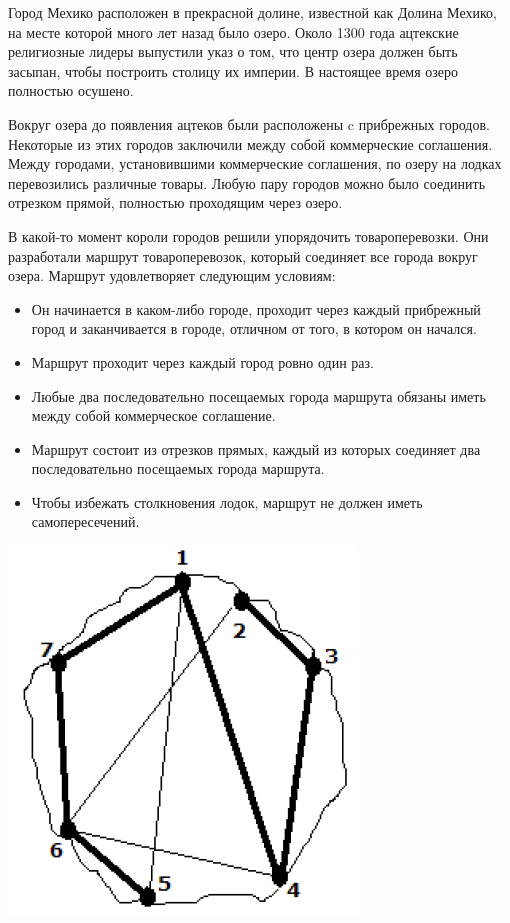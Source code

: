 Город Мехико расположен в прекрасной долине, известной как Долина Мехико, на месте
которой много лет назад было озеро. Около 1300 года ацтекские религиозные лидеры
выпустили указ о том, что центр озера должен быть засыпан, чтобы построить столицу их
империи. В настоящее время озеро полностью осушено.

Вокруг озера до появления ацтеков были расположены c прибрежных городов. Некоторые из
этих городов заключили между собой коммерческие соглашения. Между городами,
установившими коммерческие соглашения, по озеру на лодках перевозились различные
товары. Любую пару городов можно было соединить отрезком прямой, полностью
проходящим через озеро.

В какой-то момент короли городов решили упорядочить товароперевозки. Они разработали
маршрут товароперевозок, который соединяет все города вокруг озера. Маршрут
удовлетворяет следующим условиям:
\begin{itemize}
\item Он начинается в каком-либо городе, проходит через каждый прибрежный город и
заканчивается в городе, отличном от того, в котором он начался.
\item Маршрут проходит через каждый город ровно один раз.
\item Любые два последовательно посещаемых города маршрута обязаны иметь между
собой коммерческое соглашение.
\item Маршрут состоит из отрезков прямых, каждый из которых соединяет два
последовательно посещаемых города маршрута.
\item Чтобы избежать столкновения лодок, маршрут не должен иметь самопересечений.
\end{itemize}

\includegraphics{mexico.png}

